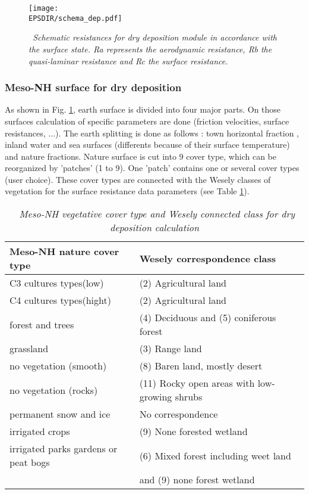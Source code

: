 \begin{figure}[htb]
\centerline{\texttt{[image: \\EPSDIR/schema\_dep.pdf]}}
\caption{\sl ~{Schematic resistances for dry deposition module in
accordance with the surface state. 
Ra represents the aerodynamic resistance, Rb the quasi-laminar
resistance and Rc the surface resistance.}}
\label{schema} 
\end{figure}
\subsubsection*{Meso-NH surface for dry deposition}
As shown in Fig. \ref{schema}, earth surface is divided into four major
parts. On those surfaces calculation of specific parameters are done
(friction velocities, surface resistances, ...). The earth splitting
is done as follows : town horizontal fraction \citep{Masson2000}, inland
water and sea surfaces (differents because of their surface
temperature) and nature fractions. Nature surface is cut into 9 cover type, 
which can be reorganized by 'patches' (1 to 9). 
One 'patch' contains one or several cover types (user choice). 
These cover types are connected with the Wesely classes of
vegetation for the surface resistance data parameters (see Table
\ref{classveg}).
\begin{table}
\begin{center}
\begin{tabular}{|l|l|} \hline
\bf{Meso-NH nature cover type} & \bf{Wesely correspondence class} \\ \hline 
 C3 cultures types(low) &       (2) Agricultural land \\ 
 C4 cultures types(hight)&      (2) Agricultural land \\ 
 forest and trees       &       (4) Deciduous and (5) coniferous
 forest \\ 
 grassland              &       (3) Range land \\ 
 no vegetation (smooth) &       (8) Baren land, mostly desert \\  
 no vegetation (rocks)  &       (11) Rocky open areas with low-growing
 shrubs \\ 
 permanent snow and ice &        No correspondence \\ 
 irrigated crops        &       (9) None forested wetland \\ 
 irrigated parks gardens or peat bogs   & (6) Mixed forest including
 weet land\\
                        &                  and (9) none forest wetland \\ 
\hline
\end{tabular}
\caption{\sl ~{Meso-NH vegetative cover type and Wesely connected
class for dry deposition calculation}}
\label{classveg}
\end{center}
\end{table}

